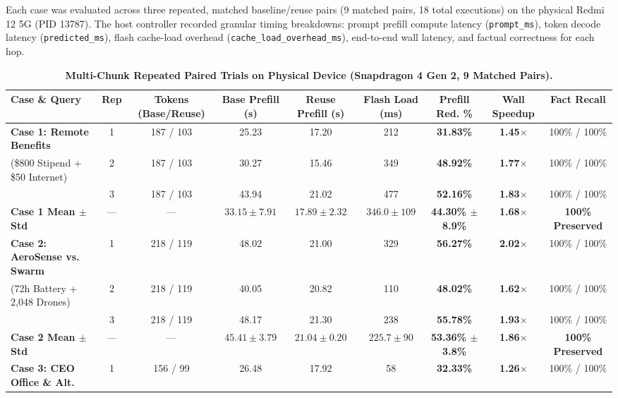 Each case was evaluated across three repeated, matched baseline/reuse pairs (9 matched pairs, 18 total executions) on the physical Redmi 12 5G (PID 13787). The host controller recorded granular timing breakdowns: prompt prefill compute latency (\texttt{prompt\_ms}), token decode latency (\texttt{predicted\_ms}), flash cache-load overhead (\texttt{cache\_load\_overhead\_ms}), end-to-end wall latency, and factual correctness for each hop.

\begin{table}[t]
\centering
\caption{\textbf{Multi-Chunk Repeated Paired Trials on Physical Device (Snapdragon 4 Gen 2, 9 Matched Pairs).}}
\label{tab:multichunk_results}
\small
\begin{tabular}{lcccccccc}
\toprule
\textbf{Case \& Query} & \textbf{Rep} & \textbf{Tokens (Base/Reuse)} & \textbf{Base Prefill (s)} & \textbf{Reuse Prefill (s)} & \textbf{Flash Load (ms)} & \textbf{Prefill Red. \%} & \textbf{Wall Speedup} & \textbf{Fact Recall} \\
\midrule
\textbf{Case 1: Remote Benefits} & 1 & 187 / 103 & 25.23 & 17.20 & 212 & \textbf{31.83\%} & \textbf{1.45$\times$} & 100\% / 100\% \\
(\$800 Stipend + \$50 Internet) & 2 & 187 / 103 & 30.27 & 15.46 & 349 & \textbf{48.92\%} & \textbf{1.77$\times$} & 100\% / 100\% \\
& 3 & 187 / 103 & 43.94 & 21.02 & 477 & \textbf{52.16\%} & \textbf{1.83$\times$} & 100\% / 100\% \\
\cmidrule{2-9}
\textbf{Case 1 Mean $\pm$ Std} & — & — & $33.15 \pm 7.91$ & $17.89 \pm 2.32$ & $346.0 \pm 109$ & \textbf{44.30\% $\pm$ 8.9\%} & \textbf{1.68$\times$} & \textbf{100\% Preserved} \\
\midrule
\textbf{Case 2: AeroSense vs. Swarm} & 1 & 218 / 119 & 48.02 & 21.00 & 329 & \textbf{56.27\%} & \textbf{2.02$\times$} & 100\% / 100\% \\
(72h Battery + 2,048 Drones) & 2 & 218 / 119 & 40.05 & 20.82 & 110 & \textbf{48.02\%} & \textbf{1.62$\times$} & 100\% / 100\% \\
& 3 & 218 / 119 & 48.17 & 21.30 & 238 & \textbf{55.78\%} & \textbf{1.93$\times$} & 100\% / 100\% \\
\cmidrule{2-9}
\textbf{Case 2 Mean $\pm$ Std} & — & — & $45.41 \pm 3.79$ & $21.04 \pm 0.20$ & $225.7 \pm 90$ & \textbf{53.36\% $\pm$ 3.8\%} & \textbf{1.86$\times$} & \textbf{100\% Preserved} \\
\midrule
\textbf{Case 3: CEO Office \& Alt.} & 1 & 156 / 99 & 26.48 & 17.92 & 58 & \textbf{32.33\%} & \textbf{1.26$\times$} & 100\% / 100\% \\

\end{tabular}
\end{table}
